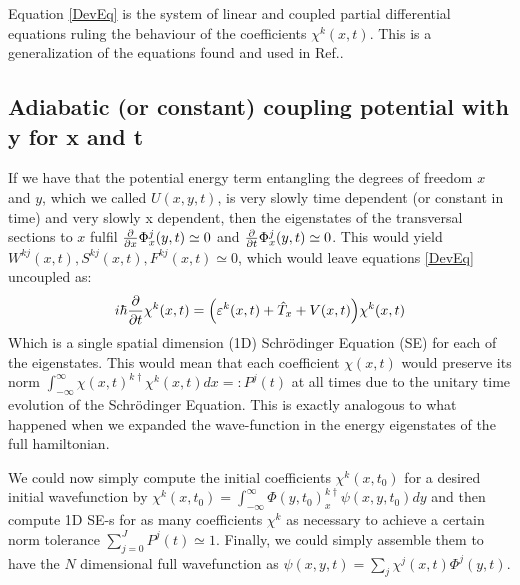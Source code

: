 \documentclass[11pt, a4paper]{article} %
\begin{document}
Equation \eqref{DevEq} is the system of linear and coupled partial differential equations ruling the behaviour of the coefficients $\chi^k(x,t)$. This is a generalization of the equations found and used in Ref.\cite{Dev}.

\subsection{Adiabatic (or constant) coupling potential with y for x and t}
If we have that the potential energy term entangling the degrees of freedom $x$ and $y$, which we called $U(x,y,t)$, is very slowly time dependent (or constant in time) and very slowly x dependent, then the eigenstates of the transversal sections to $x$ fulfil $\pdv{}{x}\Phi^j_x(y,t)\simeq 0$ and $\pdv{}{t}\Phi^j_x(y,t)\simeq 0$. This would yield $W^{kj}(x,t),S^{kj}(x,t),F^{kj}(x,t)\simeq 0$, which would leave equations \eqref{DevEq} uncoupled as:
\begin{equation}
i\hbar \pdv{}{t}\chi^k(x,t) = \qty( \varepsilon^k(x,t) + \hat{T}_x+V(x,t))\chi^k(x,t)
\end{equation}
Which is a single spatial dimension (1D) Schrödinger Equation (SE) for each of the eigenstates. This would mean that each coefficient $\chi(x,t)$ would preserve its norm $\int_{-\infty}^{\infty}\chi(x,t)^{k\dagger}\chi^k(x,t) dx =: P^j(t)$ at all times due to the unitary time evolution of the Schrödinger Equation. This is exactly analogous to what happened when we expanded the wave-function in the energy eigenstates of the full hamiltonian.

We could now simply compute the initial coefficients $\chi^k(x,t_0)$ for a desired initial wavefunction by $\chi^k(x,t_0)=\int_{-\infty}^{\infty}\Phi(y,t_0)_x^{k\dagger} \psi(x,y,t_0)dy$ and then compute 1D SE-s for as many coefficients $\chi^k$ as necessary to achieve a certain norm tolerance $\sum_{j=0}^J P^j(t) \simeq 1$. Finally, we could simply assemble them to have the $N$ dimensional full wavefunction as $\psi(x,y,t)=\sum_j\chi^j(x,t)\Phi^j(y,t)$.
\end{document}
